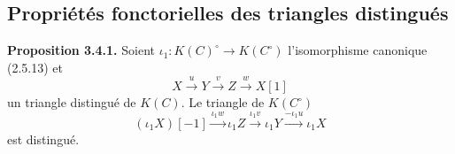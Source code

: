 \subsection{Propriétés fonctorielles des triangles distingués}

\noindent\textbf{Proposition 3.4.1.}\quad
Soient
$\iota_1\colon K(C)^{\circ}\longrightarrow K(C^{\circ})$
l'isomorphisme canonique (2.5.13) et
\[
  X\xrightarrow{u}Y\xrightarrow{v}Z\xrightarrow{w}X[1]
\]
un triangle distingué de $K(C)$. Le triangle de $K(C^{\circ})$
\[
  (\iota_1X)[-1]\xrightarrow{\iota_1w}\iota_1Z
  \xrightarrow{\iota_1v}\iota_1Y
  \xrightarrow{-\iota_1u}\iota_1X
\]
est distingué.
\endgroup

